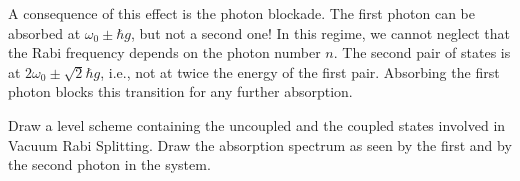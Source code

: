A consequence of this effect is the photon blockade. The first photon can be absorbed at $\omega_0 \pm \hbar g$, but not a second one!  In this regime, we cannot neglect that the Rabi frequency depends on the photon number $n$. The second pair of states is at 
$2 \omega_0 \pm \sqrt{2} \hbar g$, i.e., not at twice the energy of the first pair. Absorbing the first photon blocks this transition for any further absorption.

\begin{questions}
\item Draw a level scheme containing the uncoupled and the coupled states involved in Vacuum Rabi Splitting. Draw the absorption spectrum as seen by the first and by the second photon in the system.
\end{questions}

\printbibliography[segment=\therefsegment,heading=subbibliography]

